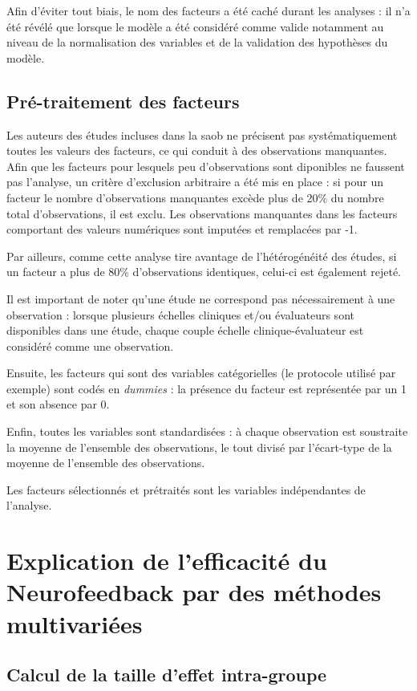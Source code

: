 Afin d'éviter tout biais, le nom des facteurs a été caché durant les analyses : il n'a été révélé que lorsque le modèle a été considéré comme valide notamment au niveau 
de la normalisation des variables et de la validation des hypothèses du modèle.  

\subsection{Pré-traitement des facteurs}

Les auteurs des études incluses dans la \gls{saob} ne précisent pas systématiquement toutes les valeurs des facteurs, ce qui conduit à des observations manquantes. Afin que 
les facteurs pour lesquels peu d'observations sont diponibles ne faussent pas l'analyse, un critère d'exclusion arbitraire a été mis en place : si pour un facteur le nombre d'observations 
manquantes excède plus de 20\% du nombre total d'observations, il est exclu. Les observations manquantes dans les facteurs comportant des valeurs numériques sont 
imputées et remplacées par -1.

Par ailleurs, comme cette analyse tire avantage de l'hétérogénéité des études, si un facteur a plus de 80\% d'observations identiques, 
celui-ci est également rejeté. 

Il est important de noter qu'une étude ne correspond pas nécessairement à une observation : lorsque plusieurs échelles cliniques et/ou évaluateurs sont disponibles dans une étude,
chaque couple échelle clinique-évaluateur est considéré comme une observation.

Ensuite, les facteurs qui sont des variables catégorielles (le protocole utilisé par exemple) sont codés en \textit{dummies} : la présence du facteur est représentée par un 1 et son absence par 0. 

Enfin, toutes les variables sont standardisées : à chaque observation est soustraite la moyenne de l'ensemble des observations, le tout divisé par l'écart-type de la moyenne de 
l'ensemble des observations. 

Les facteurs sélectionnés et prétraités sont les variables indépendantes de l'analyse.


\section{Explication de l'efficacité du Neurofeedback par des méthodes multivariées}

\subsection{Calcul de la taille d'effet intra-groupe}

